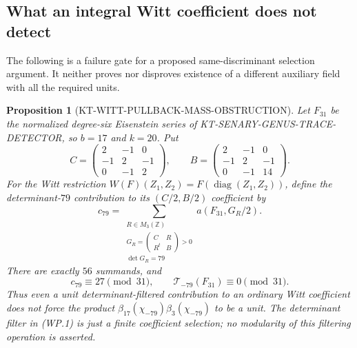 \documentclass[11pt,a4paper]{article}
\newtheorem{proposition}[theorem]{Proposition}
\theoremstyle{definition}
\begin{document}


\subsection{What an integral Witt coefficient does not detect}

The following is a failure gate for a proposed same-discriminant selection
argument.  It neither proves nor disproves existence of a different
auxiliary field with all the required units.

\begin{proposition}[KT-WITT-PULLBACK-MASS-OBSTRUCTION]
Let $F_{31}$ be the normalized degree-six Eisenstein series of
KT-SENARY-GENUS-TRACE-DETECTOR, so $b=17$ and $k=20$.  Put
\[
 C=\begin{pmatrix}2&-1&0\\-1&2&-1\\0&-1&2\end{pmatrix},
 \qquad
 B=\begin{pmatrix}2&-1&0\\-1&2&-1\\0&-1&14\end{pmatrix}.
\]
For the Witt restriction
$W(F)(Z_1,Z_2)=F(\operatorname{diag}(Z_1,Z_2))$, define the
\emph{determinant-$79$ contribution} to its $(C/2,B/2)$ coefficient by
\[
 c_{79}=
 \sum_{\substack{R\in M_3(\mathbb Z)\\
 G_R=\left(\begin{smallmatrix}C&R\\R^t&B\end{smallmatrix}\right)>0\\
 \det G_R=79}}
 a(F_{31},G_R/2).
 \tag{WP.1}
\]
There are exactly $56$ summands, and
\[
 c_{79}\equiv27\pmod{31},\qquad
 \mathcal T_{-79}(F_{31})\equiv0\pmod{31}.
 \tag{WP.2}
\]
Thus even a unit determinant-filtered contribution to an ordinary Witt
coefficient does not force the product
$\beta_{17}(\chi_{-79})\beta_3(\chi_{-79})$ to be a unit.
The determinant filter in (WP.1) is just a finite coefficient selection;
no modularity of this filtering operation is asserted.
\end{proposition}
\end{document}
